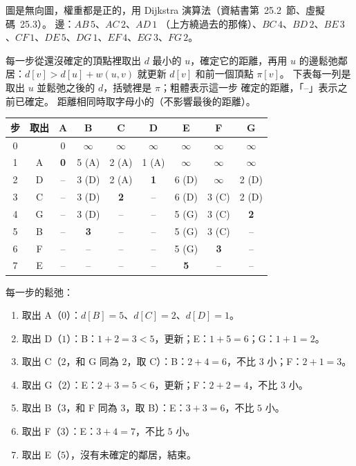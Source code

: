 \begin{pastsoln}
圖是無向圖，權重都是正的，用 Dijkstra 演算法（資結書第~25.2~節、虛擬碼~25.3）。 邊：$AB\,5$、$AC\,2$、$AD\,1$
（上方繞過去的那條）、$BC\,4$、$BD\,2$、$BE\,3$、$CF\,1$、$DE\,5$、$DG\,1$、$EF\,4$、$EG\,3$、$FG\,2$。

每一步從還沒確定的頂點裡取出 $d$ 最小的 $u$，確定它的距離，再用 $u$ 的邊鬆弛鄰居：$d[v] > d[u] + w(u,v)$
就更新 $d[v]$ 和前一個頂點 $\pi[v]$。 下表每一列是取出 $u$ 並鬆弛之後的 $d$，括號裡是 $\pi$；粗體表示這一步
確定的距離，「--」表示之前已確定。 距離相同時取字母小的（不影響最後的距離）。

\begin{center}
\small
\begin{tabular}{cc*{7}{c}}
\toprule
步 & 取出 & A & B & C & D & E & F & G \\
\midrule
0 & & 0 & $\infty$ & $\infty$ & $\infty$ & $\infty$ & $\infty$ & $\infty$ \\
1 & A & \textbf{0} & 5 (A) & 2 (A) & 1 (A) & $\infty$ & $\infty$ & $\infty$ \\
2 & D & -- & 3 (D) & 2 (A) & \textbf{1} & 6 (D) & $\infty$ & 2 (D) \\
3 & C & -- & 3 (D) & \textbf{2} & -- & 6 (D) & 3 (C) & 2 (D) \\
4 & G & -- & 3 (D) & -- & -- & 5 (G) & 3 (C) & \textbf{2} \\
5 & B & -- & \textbf{3} & -- & -- & 5 (G) & 3 (C) & -- \\
6 & F & -- & -- & -- & -- & 5 (G) & \textbf{3} & -- \\
7 & E & -- & -- & -- & -- & \textbf{5} & -- & -- \\
\bottomrule
\end{tabular}
\end{center}

每一步的鬆弛：
\begin{enumerate}
\item 取出 A（$0$）：$d[B] = 5$、$d[C] = 2$、$d[D] = 1$。
\item 取出 D（$1$）：B：$1 + 2 = 3 < 5$，更新；E：$1 + 5 = 6$；G：$1 + 1 = 2$。
\item 取出 C（$2$，和 G 同為 $2$，取 C）：B：$2 + 4 = 6$，不比 $3$ 小；F：$2 + 1 = 3$。
\item 取出 G（$2$）：E：$2 + 3 = 5 < 6$，更新；F：$2 + 2 = 4$，不比 $3$ 小。
\item 取出 B（$3$，和 F 同為 $3$，取 B）：E：$3 + 3 = 6$，不比 $5$ 小。
\item 取出 F（$3$）：E：$3 + 4 = 7$，不比 $5$ 小。
\item 取出 E（$5$），沒有未確定的鄰居，結束。
\end{enumerate}


\end{pastsoln}
